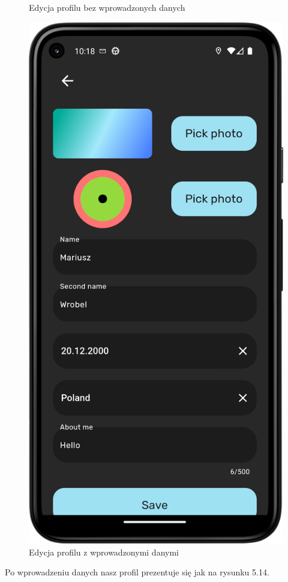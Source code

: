 \documentclass[a4paper,twoside,12pt]{book}
\begin{document}
\begin{figure}[H]
\begin{minipage}[b]{0.49\textwidth}
    \caption{Edycja profilu bez wprowadzonych danych}
  \end{minipage}
  \hfill
  \begin{minipage}[b]{0.49\textwidth}
    \includegraphics[width=\textwidth]{mobile_ss/edycja_profilu_z_danymi.png}
    \caption{Edycja profilu z wprowadzonymi danymi}
  \end{minipage}
\end{figure}
\newpage
Po wprowadzeniu danych nasz profil prezentuje się jak na rysunku 5.14.
\end{document}
